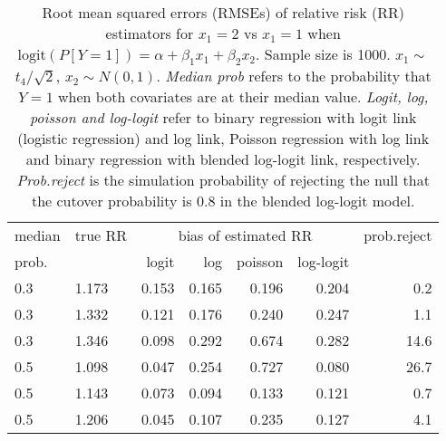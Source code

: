 \documentclass[12pt,a4paper]{article}
\begin{document}
\begin{table}[H] 
\small\sf\centering 
\caption{Root mean squared errors (RMSEs) of relative risk (RR) estimators for $x_1=2$ vs $x_1=1$ when $\mbox{logit}(P[Y=1])=\alpha+\beta_1 x_1 + \beta_2 x_2$. Sample size is 1000. $x_1 \sim $$t_4/\sqrt{2}$, $x_2 \sim N(0,1)$. {\it Median prob} refers to the probability that $Y=1$ when both covariates are at their median value. {\it Logit, log, poisson and log-logit} refer to binary regression with logit link (logistic regression) and log link, Poisson regression with log link and binary regression with blended log-logit link, respectively. {\it Prob.reject} is the simulation probability of rejecting the null that the cutover probability is $0.8$ in the blended log-logit model.} 
\begin{tabular}{llrrrrr} 
\toprule 
median & true RR & \multicolumn{4}{c}{bias of estimated RR} & prob.reject \\ 
prob. & & logit & log & poisson & log-logit  & \\ \midrule 
0.3 & 1.173 & 0.153 & 0.165 & 0.196 & 0.204 &  0.2 \\  
0.3 & 1.332 & 0.121 & 0.176 & 0.240 & 0.247 &  1.1 \\  
0.3 & 1.346 & 0.098 & 0.292 & 0.674 & 0.282 & 14.6 \\  
0.5 & 1.098 & 0.047 & 0.254 & 0.727 & 0.080 & 26.7 \\  
0.5 & 1.143 & 0.073 & 0.094 & 0.133 & 0.121 &  0.7 \\  
0.5 & 1.206 & 0.045 & 0.107 & 0.235 & 0.127 &  4.1 \\  
\bottomrule 
\end{tabular} 
\end{table} 
\end{document}
